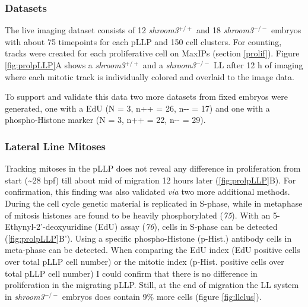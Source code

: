 \documentclass[10pt, b5paper, singlespacinge, twoside]{reedthesis} %
\theoremstyle{definition}
\theoremstyle{definition}
\theoremstyle{definition}
\theoremstyle{remark}
\begin{document}
\hypertarget{datasets}{%
\subsubsection{Datasets}\label{datasets}}

The live imaging dataset consists of 12 \emph{shroom3}\(^{+/+}\) and 18 \emph{shroom3}\(^{-/-}\) embryos with about 75 timepoints for each pLLP and 150 cell clusters. For counting, tracks were created for each proliferative cell on MaxIPs (section \ref{prolif}). Figure \ref{fig:prolpLLP}A shows a \emph{shroom3}\(^{+/+}\) and a \emph{shroom3}\(^{-/-}\) LL after 12 h of imaging where each mitotic track is individually colored and overlaid to the image data.

To support and validate this data two more datasets from fixed embryos were generated, one with a EdU (N = 3, n++ = 26, n-\/- = 17) and one with a phospho-Histone marker (N = 3, n++ = 22, n-\/- = 29).

\hypertarget{res-prolpLLP}{%
\subsubsection{Lateral Line Mitoses}\label{res-prolpLLP}}

Tracking mitoses in the pLLP does not reveal any difference in proliferation from start (\textasciitilde28 hpf) till about mid of migration 12 hours later (\ref{fig:prolpLLP}B). For confirmation, this finding was also validated \emph{via} two more additional methods. During the cell cycle genetic material is replicated in S-phase, while in metaphase of mitosis histones are found to be heavily phosphorylated (\emph{75}). With an 5-Ethynyl-2'-deoxyuridine (EdU) assay (\emph{76}), cells in S-phase can be detected (\ref{fig:prolpLLP}B'). Using a specific phospho-Histone (p-Hist.) antibody cells in meta-phase can be detected. When comparing the
EdU index (EdU positive cells over total pLLP cell number) or the mitotic index (p-Hist. positive cells over total pLLP cell number) I could confirm that there is no difference in proliferation in the migrating pLLP. Still, at the end of migration the LL system in \emph{shroom3}\(^{-/-}\) embryos does contain 9\(\%\) more cells (figure \ref{fig:llclus}).
\end{document}
